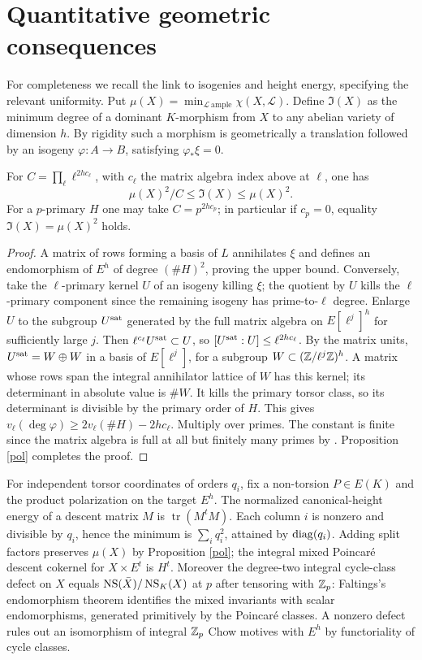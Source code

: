 \documentclass[11pt,a4paper]{article}
\theoremstyle{remark}\newtheorem{remark}[theorem]{Remark}
\begin{document}
\section{Quantitative geometric consequences}
For completeness we recall the link to isogenies and height energy, specifying the relevant uniformity. Put $\mu(X)=\min_{\mathcal L\ \mathrm{ample}}\chi(X,\mathcal L)$. Define $\mathfrak I(X)$ as the minimum degree of a dominant $K$-morphism from $X$ to any abelian variety of dimension $h$. By rigidity such a morphism is geometrically a translation followed by an isogeny $\varphi:A\to B$, satisfying $\varphi_*\xi=0$.
\begin{proposition}\label{iso}
For $C=\prod_\ell\ell^{2hc_\ell}$, with $c_\ell$ the matrix algebra index above at $\ell$, one has
\[
 \mu(X)^2/C\le\mathfrak I(X)\le\mu(X)^2.
\]
For a $p$-primary $H$ one may take $C=p^{2hc_p}$; in particular if $c_p=0$, equality $\mathfrak I(X)=\mu(X)^2$ holds.
\end{proposition}
\begin{proof}
A matrix of rows forming a basis of $L$ annihilates $\xi$ and defines an endomorphism of $E^h$ of degree $(\#H)^2$, proving the upper bound. Conversely, take the $\ell$-primary kernel $U$ of an isogeny killing $\xi$; the quotient by $U$ kills the $\ell$-primary component since the remaining isogeny has prime-to-$\ell$ degree. Enlarge $U$ to the subgroup $U^{\rm sat}$ generated by the full matrix algebra on $E[\ell^j]^h$ for sufficiently large $j$. Then $\ell^{c_\ell}U^{\rm sat}\subset U$, so $[U^{\rm sat}:U]\le\ell^{2hc_\ell}$. By the matrix units, $U^{\rm sat}=W\oplus W$ in a basis of $E[\ell^j]$, for a subgroup $W\subset(\mathbb Z/\ell^j\mathbb Z)^h$. A matrix whose rows span the integral annihilator lattice of $W$ has this kernel; its determinant in absolute value is $\#W$. It kills the primary torsor class, so its determinant is divisible by the primary order of $H$. This gives $v_\ell(\deg\varphi)\ge2v_\ell(\#H)-2hc_\ell$. Multiply over primes. The constant is finite since the matrix algebra is full at all but finitely many primes by \cite{serre}. Proposition \ref{pol} completes the proof.
\end{proof}
For independent torsor coordinates of orders $q_i$, fix a non-torsion $P\in E(K)$ and the product polarization on the target $E^h$. The normalized canonical-height energy of a descent matrix $M$ is $\operatorname{tr}(M^tM)$. Each column $i$ is nonzero and divisible by $q_i$, hence the minimum is $\sum_i q_i^2$, attained by $\operatorname{diag}(q_i)$. Adding split factors preserves $\mu(X)$ by Proposition \ref{pol}; the integral mixed Poincar\'e descent cokernel for $X\times E^t$ is $H^t$. Moreover the degree-two integral cycle-class defect on $X$ equals $\operatorname{NS}(\bar X)/\operatorname{NS}_K(X)$ at $p$ after tensoring with $\mathbb Z_p$: Faltings's endomorphism theorem \cite{faltings} identifies the mixed invariants with scalar endomorphisms, generated primitively by the Poincar\'e classes. A nonzero defect rules out an isomorphism of integral $\mathbb Z_p$ Chow motives with $E^h$ by functoriality of cycle classes.
\end{document}
